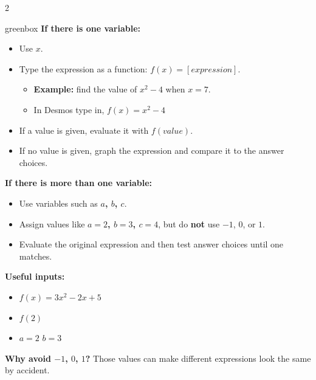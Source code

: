 \documentclass[10pt]{article}
\begin{document}
    \vspace{0.5em}

    \begin{multicols}{2}
        \begin{skillbox}{greenbox}
            \textbf{If there is one variable:}
            \begin{itemize}
                \item Use \textbf{$x$}.
                \item Type the expression as a function: $f(x)= [expression]$.
                \begin{itemize}
                    \item \textbf{Example:} find the value of $x^2-4$ when $x=7$.
                    \item In Desmos type in, $f(x)=x^2-4$
                \end{itemize}
                \item If a value is given, evaluate it with $f(value)$.
                \item If no value is given, graph the expression and compare it to the answer choices.
            \end{itemize}
            \textbf{If there is more than one variable:}
            \begin{itemize}
                \item Use variables such as \textbf{$a$, $b$, $c$}.
                \item Assign values like \textbf{$a=2$, $b=3$, $c=4$},
                but do \textbf{not} use $-1$, $0$, or $1$.
                \item Evaluate the original expression and then test answer choices until one matches.
            \end{itemize}

            \textbf{Useful inputs:}
            \begin{itemize}
                \item \textbf{$ f(x)=3x^2-2x+5 $}
                \item \textbf{$ f(2) $}
                \item $a=2$ \hspace{1em} $b=3$
            \end{itemize}

            \textbf{Why avoid $-1$, $0$, $1$?} Those values can make different expressions look the same by accident.
        \end{skillbox}


\end{multicols}
\end{document}
